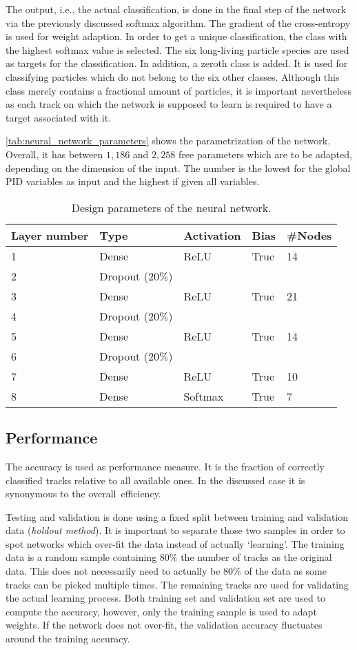 The output, i.e., the actual classification, is done in the final step of the network via the previously discussed softmax algorithm. The gradient of the cross-entropy is used for weight adaption. In order to get a unique classification, the class with the highest softmax value is selected. The six long-living particle species are used as targets for the classification. In addition, a zeroth class is added. It is used for classifying particles which do not belong to the six other classes. Although this class merely contains a fractional amount of particles, it is important nevertheless as each track on which the network is supposed to learn is required to have a target associated with it.

\autoref{tab:neural_network_parameters} shows the parametrization of the network. Overall, it has between $1,186$ and $2,258$ free parameters which are to be adapted, depending on the dimension of the input. The number is the lowest for the global PID variables as input and the highest if given all variables.

\begin{table}[ht]
	\centering
	\begin{tabular}{l|llll}
		Layer number & Type & Activation & Bias & \#Nodes  \\
		\hline
		1 & Dense & ReLU & True & 14 \\
		2 & Dropout ($20\%$) \\
		3 & Dense & ReLU & True & 21 \\
		4 & Dropout ($20\%$) \\
		5 & Dense & ReLU & True & 14 \\
		6 & Dropout ($20\%$) \\
		7 & Dense & ReLU & True & 10 \\
		8 & Dense & Softmax & True & 7
	\end{tabular}
	\caption{Design parameters of the neural network.}
	\label{tab:neural_network_parameters}
\end{table}

\subsection{Performance}
\label{sec:neural_network_performance}

The accuracy is used as performance measure. It is the fraction of correctly classified tracks relative to all available ones. In the discussed case it is synonymous to the overall~efficiency.

Testing and validation is done using a fixed split between training and validation data (\textit{holdout method}). It is important to separate those two samples in order to spot networks which over-fit the data instead of actually `learning'. The training data is a random sample containing $80\%$ the number of tracks as the original data. This does not necessarily need to actually be $80\%$ of the data as some tracks can be picked multiple times. The remaining tracks are used for validating the actual learning process. Both training set and validation set are used to compute the accuracy, however, only the training sample is used to adapt weights. If the network does not over-fit, the validation accuracy fluctuates around the training accuracy.

